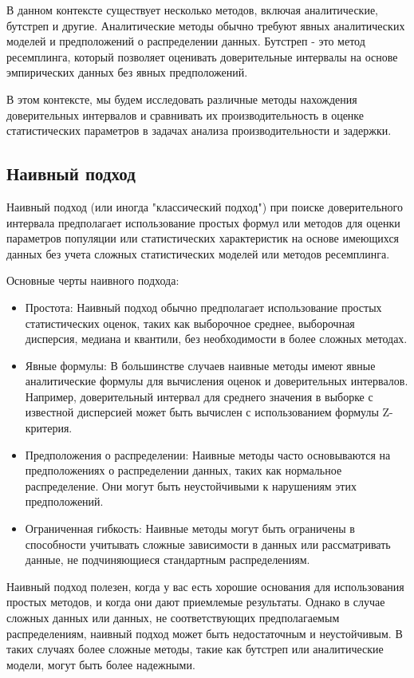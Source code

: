 \documentclass[specialist,
               substylefile = spbu_report.rtx,
               subf,href,colorlinks=true, 12pt]{disser}
\begin{document}
В данном контексте существует несколько методов, включая аналитические, бутстреп и другие. Аналитические методы обычно требуют явных аналитических моделей и предположений о распределении данных. Бутстреп - это метод ресемплинга, который позволяет оценивать доверительные интервалы на основе эмпирических данных без явных предположений.

В этом контексте, мы будем исследовать различные методы нахождения доверительных интервалов и сравнивать их производительность в оценке статистических параметров в задачах анализа производительности и задержки.

\subsection{Наивный подход}

Наивный подход (или иногда "классический подход") при поиске доверительного интервала предполагает использование простых формул или методов для оценки параметров популяции или статистических характеристик на основе имеющихся данных без учета сложных статистических моделей или методов ресемплинга.

Основные черты наивного подхода:
\begin{itemize}
    \item Простота: Наивный подход обычно предполагает использование простых статистических оценок, таких как выборочное среднее, выборочная дисперсия, медиана и квантили, без необходимости в более сложных методах.
    \item Явные формулы: В большинстве случаев наивные методы имеют явные аналитические формулы для вычисления оценок и доверительных интервалов. Например, доверительный интервал для среднего значения в выборке с известной дисперсией может быть вычислен с использованием формулы Z-критерия.
    \item Предположения о распределении: Наивные методы часто основываются на предположениях о распределении данных, таких как нормальное распределение. Они могут быть неустойчивыми к нарушениям этих предположений.
    \item Ограниченная гибкость: Наивные методы могут быть ограничены в способности учитывать сложные зависимости в данных или рассматривать данные, не подчиняющиеся стандартным распределениям.
\end{itemize}

Наивный подход полезен, когда у вас есть хорошие основания для использования простых методов, и когда они дают приемлемые результаты. Однако в случае сложных данных или данных, не соответствующих предполагаемым распределениям, наивный подход может быть недостаточным и неустойчивым. В таких случаях более сложные методы, такие как бутстреп или аналитические модели, могут быть более надежными.
\end{document}

